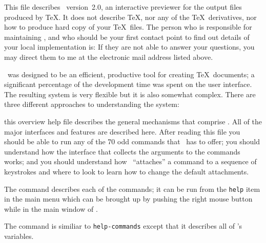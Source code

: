 This file describes \dtl\ version~2.0, an interactive previewer
for the output files produced by \TeX.  
It does not describe \TeX,
nor any of the \TeX\ derivatives, nor how to produce hard copy of your
\TeX\ files.  The person who is responsible for maintaining 
\dtl, and who should be your first contact point
to find out details of your local implementation is: 
If they are not able to answer your questions, you may direct them
to me at the electronic mail address listed above.

\Dtl\ was designed to be an efficient, productive tool for
creating \TeX\ documents; a significant percentage of the development
time was spent on the user interface.  The resulting system is very
flexible but it is also somewhat complex.  There are three different
approaches to understanding the system:  
\item this overview help file describes the general mechanisms that
comprise \dtl.  All of the major interfaces and features are
described here.  After reading this file you should be able to run any
of the 70 odd commands that \dtl\ has to offer; you should
understand how the interface that collects the arguments to the
commands works; and you should understand how \dtl\
``attaches'' a command to a sequence of keystrokes and 
where to look to learn
how to change
the default attachments.
\item The command {\tt {}} describes each of the
commands; it can be run from the {\tt help} item in the main menu which
can be brought up by pushing the right mouse button while in the main
window of \dtl.
\item The {\tt {}} command is similiar to 
{\tt help-commands} except that it describes all of \dtl's
variables.

